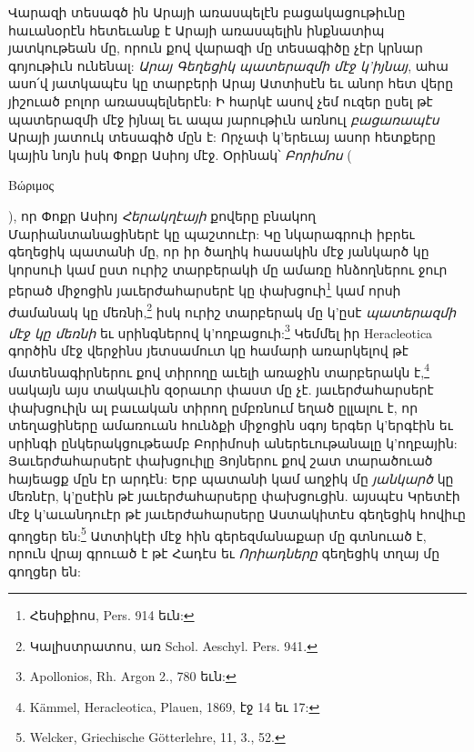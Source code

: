\documentclass{article}
\begin{document}
{Վարազի տեսագծ ին Արայի առասպելէն բացակացութիւնը հաւանօրէն հետեւանք է Արայի առասպելին ինքնատիպ յատկութեան մը, որուն քով վարազի մը տեսագիծը չէր կրնար գոյութիւն ունենալ: \emph{Արայ Գեղեցիկ պատերազմի մէջ կ'իյնայ}, ահա ասո՛վ յատկապէս կը տարբերի Արայ Ատտիսէն եւ անոր հետ վերը յիշուած բոլոր առասպելներէն: Ի հարկէ ասով չեմ ուզեր ըսել թէ պատերազմի մէջ իյնալ եւ ապա յարութիւն առնուլ \emph{բացառապէս} Արայի յատուկ տեսագիծ մըն է: Որչափ կ'երեւայ ասոր հետքերը կային նոյն իսկ Փոքր Ասիոյ մէջ. Օրինակ՝ \emph{Բորիմոս} (\begin{greek}Βώριμος\end{greek}), որ Փոքր Ասիոյ \emph{Հերակղէայի} քովերը բնակող Մարիանտանացիներէ կը պաշտուէր: Կը նկարագրուի իբրեւ գեղեցիկ պատանի մը, որ իր ծաղիկ հասակին մէջ յանկարծ կը կորսուի կամ ըստ ուրիշ տարբերակի մը ամառը հնձողներու ջուր բերած միջոցին յաւերժահարսերէ կը փախցուի\footnote{Հեսիքիոս, Pers. 914 եւն:} կամ որսի ժամանակ կը մեռնի,\footnote{Կալիստրատոս, առ Schol. Aeschyl. Pers. 941.} իսկ ուրիշ տարբերակ մը կ'ըսէ \emph{պատերազմի մէջ կը մեռնի} եւ սրինգներով կ'ողբացուի:\footnote{Apollonios, Rh. Argon 2., 780 եւն:} Կեմմել իր Heracleotica գործին մէջ վերջինս յետսամուտ կը համարի առարկելով թէ մատենագիրներու քով տիրողը աւելի առաջին տարբերակն է,\footnote{Kämmel, Heracleotica, Plauen, 1869, էջ 14 եւ 17:} սակայն այս տակաւին զօրաւոր փաստ մը չէ. յաւերժահարսերէ փախցուիլն ալ բաւական տիրող ըմբռնում եղած ըլլալու է, որ տեղացիները ամառուան հունձքի միջոցին սգոյ երգեր կ'երգէին եւ սրինգի ընկերակցութեամբ Բորիմոսի աներեւութանալը կ'ողբային: Յաւերժահարսերէ փախցուիլը Յոյներու քով շատ տարածուած հայեացք մըն էր արդէն: Երբ պատանի կամ աղջիկ մը \emph{յանկարծ} կը մեռնէր, կ'ըսէին թէ յաւերժահարսերը փախցուցին. այսպէս Կրետէի մէջ կ'աւանդուէր թէ յաւերժահարսերը Աստակիտէս գեղեցիկ հովիւը գողցեր են:\footnote{Welcker, Griechische Götterlehre, 11, 3., 52.} Ատտիկէի մէջ հին գերեզմանաքար մը գտնուած է, որուն վրայ գրուած է թէ Հադէս եւ \emph{Որիադները} գեղեցիկ տղայ մը գողցեր են:

}
\end{document}
